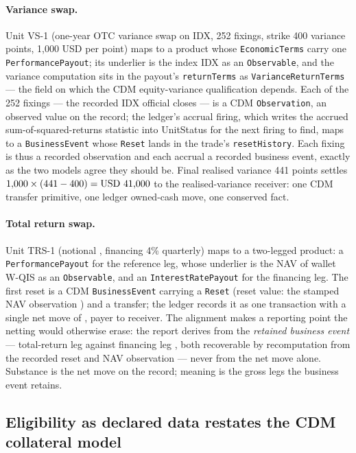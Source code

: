 \paragraph{Variance swap.} Unit VS-1 (one-year OTC variance swap on IDX, 252
fixings, strike 400 variance points, 1{,}000 USD per point) maps to a product
whose \texttt{EconomicTerms} carry one \texttt{PerformancePayout}; its underlier
is the index IDX as an \texttt{Observable}, and the variance computation sits in
the payout's \texttt{returnTerms} as \texttt{VarianceReturnTerms} --- the field on
which the CDM equity-variance qualification depends. Each of the 252 fixings ---
the recorded IDX official closes --- is a CDM \texttt{Observation}, an observed
value on the record; the ledger's accrual firing, which writes the accrued
sum-of-squared-returns statistic into UnitStatus for the next firing to find,
maps to a \texttt{BusinessEvent} whose \texttt{Reset} lands in the trade's
\texttt{resetHistory}. Each fixing is thus a recorded observation and each
accrual a recorded business event, exactly as the two models agree they should
be. Final realised variance 441 points settles $1{,}000 \times (441-400) =
\mbox{USD~41{,}000}$ to the realised-variance receiver: one CDM transfer primitive,
one ledger owned-cash move, one conserved fact.

\paragraph{Total return swap.} Unit TRS-1 (notional ,
financing 4\% quarterly) maps to a two-legged product: a
\texttt{PerformancePayout} for the reference leg, whose underlier is the NAV of
wallet W-QIS as an \texttt{Observable}, and an \texttt{InterestRatePayout} for the
financing leg. The first reset is a CDM \texttt{BusinessEvent} carrying a
\texttt{Reset} (reset value: the stamped NAV observation )
and a transfer; the ledger records it as one transaction with a single net move
of , payer to receiver. The alignment makes a reporting point the
netting would otherwise erase: the report derives from the \emph{retained
business event} --- total-return leg  against financing leg
, both recoverable by recomputation from the recorded reset and
NAV observation --- never from the  net move alone. Substance is
the net move on the record; meaning is the gross legs the business event retains.

\subsection{Eligibility as declared data restates the CDM collateral model}

